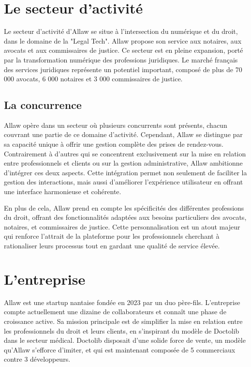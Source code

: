 \section{Le secteur d'activité} 
Le secteur d'activité d'Allaw se situe à l'intersection du numérique et du droit, dans le domaine de la "Legal Tech". Allaw propose son service aux notaires, aux avocats et aux commissaires de justice. Ce secteur est en pleine expansion, porté par la transformation numérique des professions juridiques. Le marché français des services juridiques représente un potentiel important, composé de plus de 70 000 avocats, 6 000 notaires et 3 000 commissaires de justice. 

\subsection{La concurrence} 
Allaw opère dans un secteur où plusieurs concurrents sont présents, chacun couvrant une partie de ce domaine d'activité. Cependant, Allaw se distingue par sa capacité unique à offrir une gestion complète des prises de rendez-vous. Contrairement à d'autres qui se concentrent exclusivement sur la mise en relation entre professionnels et clients ou sur la gestion administrative, Allaw ambitionne d'intégrer ces deux aspects. Cette intégration permet non seulement de faciliter la gestion des interactions, mais aussi d'améliorer l'expérience utilisateur en offrant une interface harmonieuse et cohérente.

En plus de cela, Allaw prend en compte les spécificités des différentes professions du droit, offrant des fonctionnalités adaptées aux besoins particuliers des avocats, notaires, et commissaires de justice. Cette personnalisation est un atout majeur qui renforce l'attrait de la plateforme pour les professionnels cherchant à rationaliser leurs processus tout en gardant une qualité de service élevée.

\section{L'entreprise} 
Allaw est une startup nantaise fondée en 2023 par un duo père-fils. L'entreprise compte actuellement une dizaine de collaborateurs et connaît une phase de croissance active. Sa mission principale est de simplifier la mise en relation entre les professionnels du droit et leurs clients, en s'inspirant du modèle de Doctolib dans le secteur médical. Doctolib disposait d'une solide force de vente, un modèle qu'Allaw s'efforce d'imiter, et qui est maintenant composée de 5 commerciaux contre 3 développeurs.

